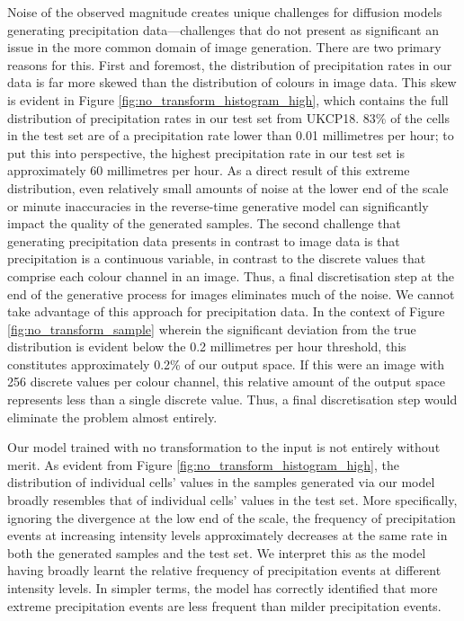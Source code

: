 \documentclass[ oneside,%
                    author={George Herbert},
                    degree={MSci},
                     title={Video Diffusion Models for Climate Simulations},
                  subtitle={}]{dissertation}
\begin{document}
Noise of the observed magnitude creates unique challenges for diffusion models generating precipitation data---challenges that do not present as significant an issue in the more common domain of image generation. There are two primary reasons for this. First and foremost, the distribution of precipitation rates in our data is far more skewed than the distribution of colours in image data. This skew is evident in Figure \ref{fig:no_transform_histogram_high}, which contains the full distribution of precipitation rates in our test set from UKCP18. 83\% of the cells in the test set are of a precipitation rate lower than 0.01 millimetres per hour; to put this into perspective, the highest precipitation rate in our test set is approximately 60 millimetres per hour. As a direct result of this extreme distribution, even relatively small amounts of noise at the lower end of the scale or minute inaccuracies in the reverse-time generative model can significantly impact the quality of the generated samples. The second challenge that generating precipitation data presents in contrast to image data is that precipitation is a continuous variable, in contrast to the discrete values that comprise each colour channel in an image. Thus, a final discretisation step at the end of the generative process for images eliminates much of the noise. We cannot take advantage of this approach for precipitation data. In the context of Figure \ref{fig:no_transform_sample} wherein the significant deviation from the true distribution is evident below the 0.2 millimetres per hour threshold, this constitutes approximately 0.2\% of our output space. If this were an image with 256 discrete values per colour channel, this relative amount of the output space represents less than a single discrete value. Thus, a final discretisation step would eliminate the problem almost entirely.

Our model trained with no transformation to the input is not entirely without merit. As evident from Figure \ref{fig:no_transform_histogram_high}, the distribution of individual cells' values in the samples generated via our model broadly resembles that of individual cells' values in the test set. More specifically, ignoring the divergence at the low end of the scale, the frequency of precipitation events at increasing intensity levels approximately decreases at the same rate in both the generated samples and the test set. We interpret this as the model having broadly learnt the relative frequency of precipitation events at different intensity levels. In simpler terms, the model has correctly identified that more extreme precipitation events are less frequent than milder precipitation events.
\end{document}
